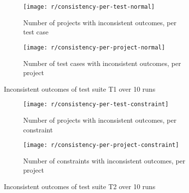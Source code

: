 \begin{figure}[htpb]
    \centering
    \begin{subfigure}{.75\textwidth}
        \texttt{[image: r/consistency-per-test-normal]}%
        \vspace{-\medskipamount}
        \caption{Number of projects with inconsistent outcomes, per test case}
        \label{fig:consistency_per_test_normal}
    \end{subfigure}

    \bigskip

    \begin{subfigure}{.75\textwidth}
        \texttt{[image: r/consistency-per-project-normal]}%
        \vspace{-\medskipamount}
        \caption{Number of test cases with inconsistent outcomes, per project}
        \label{fig:consistency_per_project_normal}
    \end{subfigure}

    \caption{Inconsistent outcomes of test suite T1 over 10 runs}
    \label{fig:consistency_normal}
\end{figure}

\begin{figure}[htpb]
    \centering
    \begin{subfigure}{.75\textwidth}
        \texttt{[image: r/consistency-per-test-constraint]}%
        \vspace{-\medskipamount}
        \caption{Number of projects with inconsistent outcomes, per constraint}
        \label{fig:consistency_per_test_constraint}
    \end{subfigure}

    \bigskip

    \begin{subfigure}{.75\textwidth}
        \texttt{[image: r/consistency-per-project-constraint]}%
        \vspace{-\medskipamount}
        \caption{Number of constraints with inconsistent outcomes, per project}
        \label{fig:consistency_per_project_constraint}
    \end{subfigure}

    \caption{Inconsistent outcomes of test suite T2 over 10 runs}
    \label{fig:consistency_constraint}
\end{figure}

